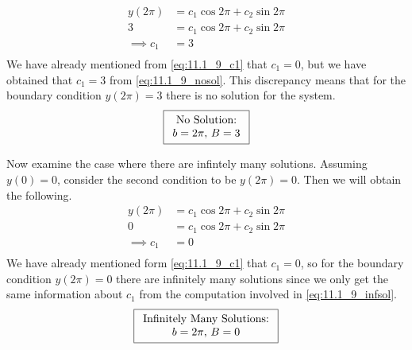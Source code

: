 \documentclass[12pt]{article}
\begin{document}
\begin{equation}
  \label{eq:11.1_9_nosol}
  \begin{aligned}
    y(2\pi)&=c_1\cos 2\pi + c_2\sin 2\pi \\
    3&=c_1\cos 2\pi + c_2\sin 2\pi \\
    \implies c_1 &= 3 \\
  \end{aligned}
\end{equation}
We have already mentioned from \cref{eq:11.1_9_c1} that $c_1=0$, but
we have obtained that $c_1=3$ from \cref{eq:11.1_9_nosol}.  This
discrepancy means that for the boundary condition $y(2\pi)=3$ there is
no solution for the system.
\begin{equation*}
\boxed{
  \begin{array}[c]{c}
    \text{No Solution:} \\
    b=2\pi,\,B=3 \\
  \end{array}
}
\end{equation*}


Now examine the case where there are infintely many solutions.
Assuming $y(0)=0$, consider the second condition to be
$y(2\pi)=0$. Then we will obtain the following.
\begin{equation}
  \label{eq:11.1_9_infsol}
  \begin{aligned}
    y(2\pi)&=c_1\cos 2\pi + c_2\sin 2\pi \\
    0&=c_1\cos 2\pi + c_2\sin 2\pi \\
    \implies c_1 &= 0 \\
  \end{aligned}
\end{equation}
We have already mentioned form \cref{eq:11.1_9_c1} that $c_1=0$, so
for the boundary condition $y(2\pi)=0$ there are infinitely many
solutions since we only get the same information about $c_1$ from
the computation involved in \cref{eq:11.1_9_infsol}.
\begin{equation*}
\boxed{
  \begin{array}[c]{c}
    \text{Infinitely Many Solutions:} \\
    b=2\pi,\,B=0 \\
  \end{array}
}
\end{equation*}
\end{document}

